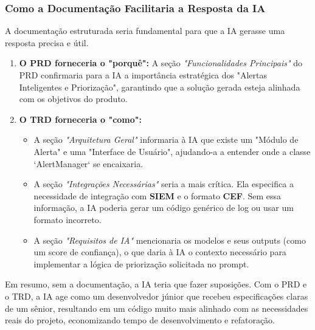 \documentclass[a4paper,12pt]{article}
\begin{document}
\subsubsection{Como a Documentação Facilitaria a Resposta da IA}
A documentação estruturada seria fundamental para que a IA gerasse uma resposta precisa e útil.

\begin{enumerate}
    \item \textbf{O PRD forneceria o "porquê":} A seção \textit{"Funcionalidades Principais"} do PRD confirmaria para a IA a importância estratégica dos "Alertas Inteligentes e Priorização", garantindo que a solução gerada esteja alinhada com os objetivos do produto.
    
    \item \textbf{O TRD forneceria o "como":}
    \begin{itemize}
        \item A seção \textit{"Arquitetura Geral"} informaria à IA que existe um "Módulo de Alerta" e uma "Interface de Usuário", ajudando-a a entender onde a classe `AlertManager` se encaixaria.
        \item A seção \textit{"Integrações Necessárias"} seria a mais crítica. Ela especifica a necessidade de integração com \textbf{SIEM} e o formato \textbf{CEF}. Sem essa informação, a IA poderia gerar um código genérico de log ou usar um formato incorreto.
        \item A seção \textit{"Requisitos de IA"} mencionaria os modelos e seus outputs (como um score de confiança), o que daria à IA o contexto necessário para implementar a lógica de priorização solicitada no prompt.
    \end{itemize}
\end{enumerate}

Em resumo, sem a documentação, a IA teria que fazer suposições. Com o PRD e o TRD, a IA age como um desenvolvedor júnior que recebeu especificações claras de um sênior, resultando em um código muito mais alinhado com as necessidades reais do projeto, economizando tempo de desenvolvimento e refatoração.




\end{document}
